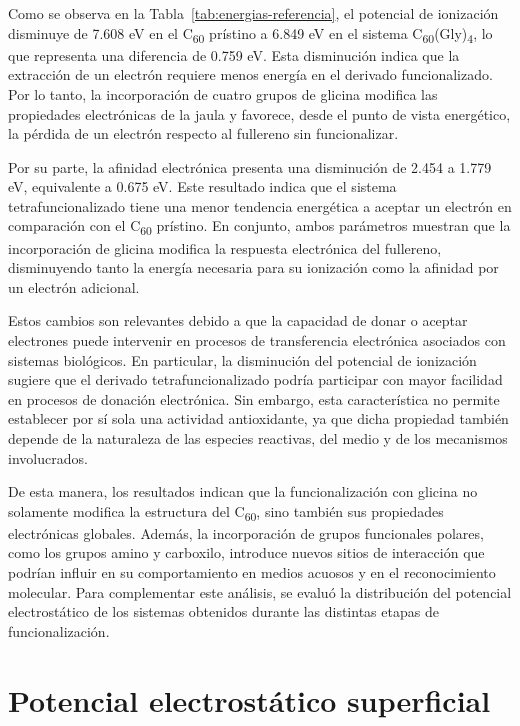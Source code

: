 Como se observa en la Tabla~\ref{tab:energias-referencia}, el potencial de ionización disminuye de 7.608 eV en el C\textsubscript{60} prístino a 6.849 eV en el sistema C\textsubscript{60}(Gly)\textsubscript{4}, lo que representa una diferencia de 0.759 eV. Esta disminución indica que la extracción de un electrón requiere menos energía en el derivado funcionalizado. Por lo tanto, la incorporación de cuatro grupos de glicina modifica las propiedades electrónicas de la jaula y favorece, desde el punto de vista energético, la pérdida de un electrón respecto al fullereno sin funcionalizar.

Por su parte, la afinidad electrónica presenta una disminución de 2.454 a 1.779 eV, equivalente a 0.675 eV. Este resultado indica que el sistema tetrafuncionalizado tiene una menor tendencia energética a aceptar un electrón en comparación con el C\textsubscript{60} prístino. En conjunto, ambos parámetros muestran que la incorporación de glicina modifica la respuesta electrónica del fullereno, disminuyendo tanto la energía necesaria para su ionización como la afinidad por un electrón adicional.

Estos cambios son relevantes debido a que la capacidad de donar o aceptar electrones puede intervenir en procesos de transferencia electrónica asociados con sistemas biológicos. En particular, la disminución del potencial de ionización sugiere que el derivado tetrafuncionalizado podría participar con mayor facilidad en procesos de donación electrónica. Sin embargo, esta característica no permite establecer por sí sola una actividad antioxidante, ya que dicha propiedad también depende de la naturaleza de las especies reactivas, del medio y de los mecanismos involucrados.

De esta manera, los resultados indican que la funcionalización con glicina no solamente modifica la estructura del C\textsubscript{60}, sino también sus propiedades electrónicas globales. Además, la incorporación de grupos funcionales polares, como los grupos amino y carboxilo, introduce nuevos sitios de interacción que podrían influir en su comportamiento en medios acuosos y en el reconocimiento molecular. Para complementar este análisis, se evaluó la distribución del potencial electrostático de los sistemas obtenidos durante las distintas etapas de funcionalización.


\section{Potencial electrostático superficial}

